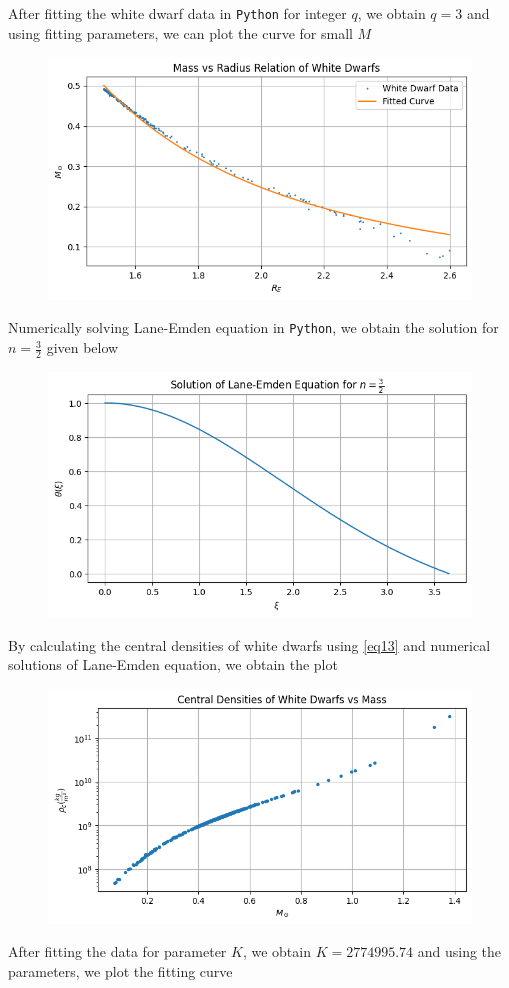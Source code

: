 \documentclass[aps,twocolumn,showpacs,preprintnumbers,nofootinbib,prl,superscriptaddress,groupedaddress]{revtex4-2}
\begin{document}
After fitting the white dwarf data in \texttt{Python} for integer $q$, we obtain $q=3$ and using fitting parameters, we can plot the curve for small $M$

\begin{figure}[!htb]
	\centering
	\includegraphics[width=0.5\linewidth]{Plots/newton-part-c1}
	\caption{}
	\label{fig:newton-part-c1}
\end{figure}

Numerically solving Lane-Emden equation in \texttt{Python}, we obtain the solution for $n=\frac{3}{2}$ given below 

\begin{figure}[!htb]
	\centering
	\includegraphics[width=0.5\linewidth]{Plots/newton-part-c2}
	\caption{}
	\label{fig:newton-part-c2}
\end{figure}


By calculating the central densities of white dwarfs using \ref{eq13} and numerical solutions of Lane-Emden equation, we obtain the plot

\begin{figure}[!htb]
	\centering
	\includegraphics[width=0.5\linewidth]{Plots/newton-part-c3}
	\caption{}
	\label{fig:newton-part-c3}
\end{figure}

After fitting the data for parameter $K$, we obtain $K = 2774995.74$ and using the parameters, we plot the fitting curve
\end{document}
